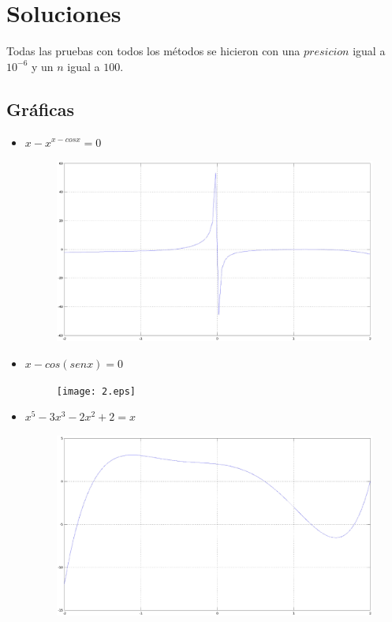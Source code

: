 \documentclass[a4paper,12pt]{article}
\begin{document}
  
  
  
  \section{Soluciones}
  
    Todas las pruebas con todos los métodos se hicieron con una $presicion$ igual a $10^{-6}$ y un $n$ igual a $100$. 
  
    \subsection{Gráficas}
    
    \begin{itemize}
     \item $x-x^{x-cosx} = 0$
     
     \begin{figure}[h]
      \centering
      \includegraphics[scale = 0.3]{1.eps}
     \end{figure}

     
     \item $x-cos(senx) = 0$
     
     \begin{figure}[h]
      \centering
      \texttt{[image: 2.eps]}
     \end{figure}
     
     \newpage
     
     \item $x^5 - 3x^3 - 2x^2 + 2 = x$
     
     \begin{figure}[h]
      \centering
      \includegraphics[scale = 0.3]{3.eps}
     \end{figure}
    \end{itemize}
\end{document}
